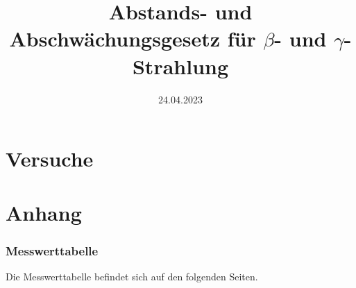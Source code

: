 
\usepackage{isotope}

\title{Abstands- und Abschwächungsgesetz für \texorpdfstring{$\beta$}{Beta}- und \texorpdfstring{$\gamma$}{Gamma}-Strahlung}
\date{24.04.2023}


\maketitle


\newpage

\newpage
\part{Versuche}

\newpage

\newpage

\newpage

\newpage
\part{Anhang}
\printbibliography[heading=bibnumbered,title=Referenzen und Literatur]
\newpage
\section{Messwerttabelle}
Die Messwerttabelle befindet sich auf den folgenden Seiten.

